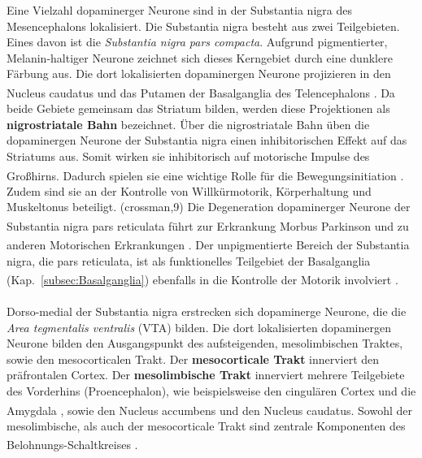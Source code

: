 \documentclass[12pt,a4paper,pdftex]{article}
\begin{document}
Eine Vielzahl dopaminerger Neurone sind in der Substantia nigra des Mesencephalons lokalisiert.
Die Substantia nigra besteht aus zwei Teilgebieten. Eines davon ist die \textit{Substantia nigra pars compacta}. 
Aufgrund pigmentierter, Melanin-haltiger Neurone zeichnet sich dieses Kerngebiet durch eine dunklere Färbung aus.
Die dort lokalisierten dopaminergen Neurone projizieren in den Nucleus caudatus und das Putamen der Basalganglia des Telencephalons \textsuperscript{\cite[9]{crossman2014neuroanatomy}}.
Da beide Gebiete gemeinsam das Striatum bilden, werden diese Projektionen als \textbf{nigrostriatale Bahn}  bezeichnet.
Über die nigrostriatale Bahn üben die dopaminergen Neurone der Substantia nigra einen inhibitorischen Effekt auf das Striatums aus. Somit wirken sie inhibitorisch auf motorische Impulse des Großhirns.
Dadurch spielen sie eine wichtige Rolle für die Bewegungsinitiation \textsuperscript{\cite[6]{trepel2011neuroanatomie}}.
Zudem sind sie an der Kontrolle von Willkürmotorik, Körperhaltung und Muskeltonus beteiligt. (crossman,9)
Die Degeneration dopaminerger Neurone der Substantia nigra pars reticulata führt zur Erkrankung Morbus Parkinson \textsuperscript{\cite[9]{crossman2014neuroanatomy}} und zu anderen Motorischen Erkrankungen \textsuperscript{\cite[13]{kandel2013principles}}.
Der unpigmentierte Bereich der Substantia nigra, die pars reticulata, ist als funktionelles Teilgebiet der Basalganglia (Kap.~\ref{subsec:Basalganglia}) ebenfalls in die Kontrolle der Motorik involviert \textsuperscript{\cite[9]{crossman2014neuroanatomy}}.
\\
\\
Dorso-medial der Substantia nigra erstrecken sich dopaminerge Neurone, die die \textit{Area tegmentalis ventralis} (VTA) bilden. Die dort lokalisierten dopaminergen Neurone bilden den Ausgangspunkt des aufsteigenden, mesolimbischen Traktes, sowie den mesocorticalen Trakt. Der \textbf{mesocorticale Trakt} innerviert den präfrontalen Cortex. Der \textbf{mesolimbische Trakt} innerviert mehrere Teilgebiete des Vorderhins (Proencephalon), wie beispielsweise den cingulären Cortex und die Amygdala \textsuperscript{\cite[9]{crossman2014neuroanatomy}}, sowie den Nucleus accumbens und den Nucleus caudatus.
Sowohl der mesolimbische, als auch der mesocorticale Trakt sind zentrale Komponenten des Belohnungs-Schaltkreises \textsuperscript{\cite[49]{kandel2013principles}}.
\end{document}

